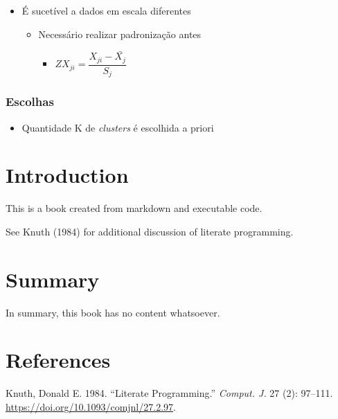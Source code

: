 \documentclass[
  letterpaper,
  DIV=11,
  numbers=noendperiod]{scrreprt}
\providecommand{\tightlist}{%
  \setlength{\itemsep}{0pt}\setlength{\parskip}{0pt}}\usepackage{longtable,booktabs,array}
\newlength{\cslhangindent}
\newlength{\cslentryspacingunit} %
\newenvironment{CSLReferences}[2] %
 {%
  \setlength{\parindent}{0pt}
  \ifodd #1
  \let\oldpar\par
  \def\par{\hangindent=\cslhangindent\oldpar}
  \fi
  \setlength{\parskip}{#2\cslentryspacingunit}
 }%
 {}
\begin{document}
\begin{itemize}
\tightlist
\item
  É sucetível a dados em escala diferentes

  \begin{itemize}
  \tightlist
  \item
    Necessário realizar padronização antes

    \begin{itemize}
    \tightlist
    \item
      \(ZX_{ji}=\dfrac{X_{ji}-\bar{X_j}}{S_j}\)
    \end{itemize}
  \end{itemize}
\end{itemize}

\hypertarget{escolhas-1}{%
\subsection{Escolhas}\label{escolhas-1}}

\begin{itemize}
\tightlist
\item
  Quantidade K de \emph{clusters} é escolhida a priori
\end{itemize}


\hypertarget{introduction}{%
\chapter{Introduction}\label{introduction}}

This is a book created from markdown and executable code.

See Knuth (1984) for additional discussion of literate programming.


\hypertarget{summary}{%
\chapter{Summary}\label{summary}}

In summary, this book has no content whatsoever.


\hypertarget{references}{%
\chapter*{References}\label{references}}

\hypertarget{refs}{}
\begin{CSLReferences}{1}{0}
\leavevmode{}%
Knuth, Donald E. 1984. {``Literate Programming.''} \emph{Comput. J.} 27
(2): 97--111. \url{https://doi.org/10.1093/comjnl/27.2.97}.

\end{CSLReferences}
\end{document}
